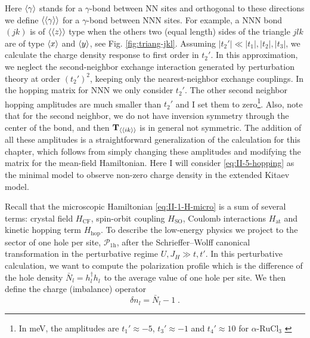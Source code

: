 Here $\braket{\gamma}$ stands for a $\gamma$-bond between NN sites and orthogonal to these directions we define $\braket{\braket{\gamma}}$ for a $\gamma$-bond between NNN sites. For example, a NNN bond  $(jk)$ is of $\braket{\braket{z}}$ type when the others two (equal length) sides of the triangle $jlk$  are of type $\braket{x}$ and $\braket{y}$, see Fig. \ref{fig:triang-jkl}.
Assuming   $|t_2'|\ll |t_1|,|t_2|,|t_3|$, we calculate the charge density response to first order in $t_2'$. In this approximation, we neglect the second-neighbor exchange interaction generated by perturbation theory at order $(t_2')^2$, keeping only the nearest-neighbor exchange couplings.
In the hopping matrix for NNN we only consider $t_2'$.
The other second neighbor hopping amplitudes are much smaller than $t_2'$ and I set them to zero\footnote{In meV, the amplitudes are $t_1'\approx - 5$, $t_3'\approx - 1$ and $t_4'\approx 10$ for $\alpha\text{-RuCl}_3$ \cite{Winter_2016}}.
Also, note that for the second neighbor, we do not have inversion symmetry through the center of the bond, and then $\mathbf{T}_{\braket{\braket{ik}}}$ is in general not symmetric. %
The addition of all these amplitudes is a straightforward generalization of the calculation for this chapter, which follows from simply changing these amplitudes and modifying the matrix for the mean-field Hamiltonian.
Here I will consider \eqref{eq:II-5-hopping} as the minimal model to observe non-zero charge density in the extended Kitaev model.




Recall that the microscopic Hamiltonian  \eqref{eq:II-1-H-micro} is a sum of several terms: crystal field $H_{\mathrm{CF}}$, spin-orbit coupling $H_{\mathrm{SO}}$, Coulomb interactions $H_{\mathrm{at}}$  and kinetic hopping term $H_{\mathrm{hop}}$.
To describe the low-energy physics we project to the sector of one hole per site, $\mathcal{P}_{1\text{h}}$, after the Schrieffer–Wolff canonical transformation in the perturbative regime $U, J_H \gg t,t'$.
In this perturbative calculation, we want to compute the polarization profile which is the difference of the hole density $\bar{N}_l=h_l^\dagger h_l^{\phantom{\dagger}} $ to the average value of one hole per site.
We then define the charge (imbalance) operator
\begin{equation}
    \delta n_l = \bar{N}_l -1  \; .
\end{equation}

